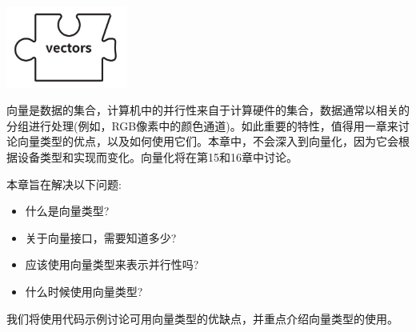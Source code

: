 \begin{center}
	\includegraphics[width=0.3\textwidth]{content/chapter-11/images/1}
\end{center}

向量是数据的集合，计算机中的并行性来自于计算硬件的集合，数据通常以相关的分组进行处理(例如，RGB像素中的颜色通道)。如此重要的特性，值得用一章来讨论向量类型的优点，以及如何使用它们。本章中，不会深入到向量化，因为它会根据设备类型和实现而变化。向量化将在第15和16章中讨论。\par

本章旨在解决以下问题:\par

\begin{itemize}
	\item 什么是向量类型?
	\item 关于向量接口，需要知道多少?
	\item 应该使用向量类型来表示并行性吗?
	\item 什么时候使用向量类型?
\end{itemize}

我们将使用代码示例讨论可用向量类型的优缺点，并重点介绍向量类型的使用。\par




























